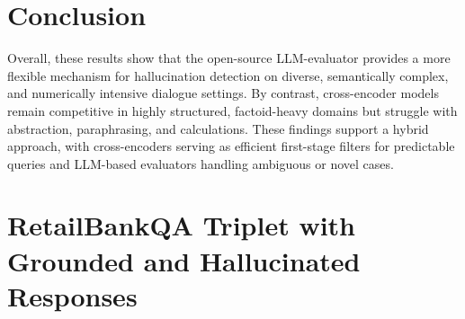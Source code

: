 \documentclass[11pt]{article}
\begin{document}
\section{Conclusion}
Overall, these results show that the open-source LLM-evaluator provides a more flexible mechanism for hallucination detection on diverse, semantically complex, and numerically intensive dialogue settings. By contrast, cross-encoder models remain competitive in highly structured, factoid-heavy domains but struggle with abstraction, paraphrasing, and calculations. 
These findings support a hybrid approach, with cross-encoders serving as efficient first-stage filters for predictable queries and LLM-based evaluators handling ambiguous or novel cases.




\clearpage


\appendix

\section{RetailBankQA Triplet with Grounded and Hallucinated Responses}
\label{app:test_case}
\FloatBarrier
\end{document}
